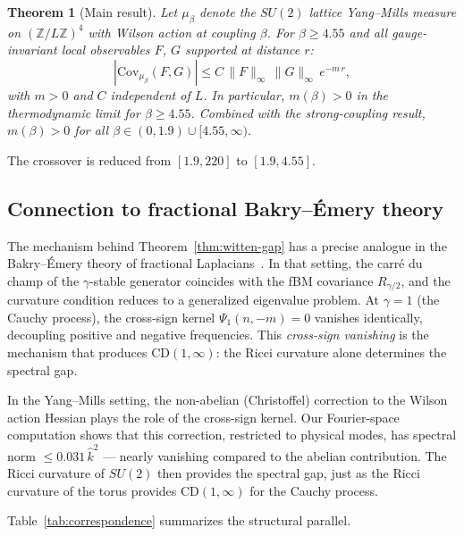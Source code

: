 \documentclass[11pt,a4paper]{article}
\theoremstyle{plain}
\newtheorem{theorem}{Theorem}[section]
\theoremstyle{definition}
\theoremstyle{remark}
\newcommand{\Z}{\mathbb{Z}}
\newcommand{\Cov}{\mathrm{Cov}}
\newcommand{\khat}{\hat{k}}
\begin{document}
\begin{theorem}[Main result]\label{thm:main}
Let $\mu_\beta$ denote the $SU(2)$ lattice Yang--Mills measure
on $(\Z/L\Z)^4$ with Wilson action at coupling $\beta$.
For $\beta \geq 4.55$ and all gauge-invariant local observables
$F$, $G$ supported at distance $r$:
\begin{equation}\label{eq:main}
  |\Cov_{\mu_\beta}(F, G)| \leq C\,\|F\|_\infty\,\|G\|_\infty\,
  e^{-m\,r},
\end{equation}
with $m > 0$ and $C$ independent of $L$. In particular,
$m(\beta) > 0$ in the thermodynamic limit for $\beta \geq 4.55$.
Combined with the strong-coupling result, $m(\beta) > 0$
for all $\beta \in (0, 1.9) \cup [4.55, \infty)$.
\end{theorem}

The crossover is reduced from $[1.9, 220]$ to $[1.9, 4.55]$.

\subsection{Connection to fractional Bakry--\'Emery theory}

The mechanism behind Theorem~\ref{thm:witten-gap} has a
precise analogue in the Bakry--\'Emery theory of fractional
Laplacians~\cite{Fontes2026b}.
In that setting, the carr\'e du champ of the $\gamma$-stable
generator coincides with the fBM covariance $R_{\gamma/2}$,
and the curvature condition reduces to a generalized eigenvalue
problem.
At $\gamma = 1$ (the Cauchy process), the cross-sign kernel
$\Psi_1(n, -m) = 0$ vanishes identically, decoupling positive
and negative frequencies.
This \emph{cross-sign vanishing} is the mechanism that produces
$\mathrm{CD}(1, \infty)$: the Ricci curvature alone determines
the spectral gap.

In the Yang--Mills setting, the non-abelian (Christoffel)
correction to the Wilson action Hessian plays the role of the
cross-sign kernel.
Our Fourier-space computation shows that this correction,
restricted to physical modes, has spectral norm $\leq 0.031\,\khat^2$
--- nearly vanishing compared to the abelian contribution.
The Ricci curvature of $SU(2)$ then provides the spectral gap,
just as the Ricci curvature of the torus provides
$\mathrm{CD}(1, \infty)$ for the Cauchy process.

Table~\ref{tab:correspondence} summarizes the structural parallel.
\end{document}
